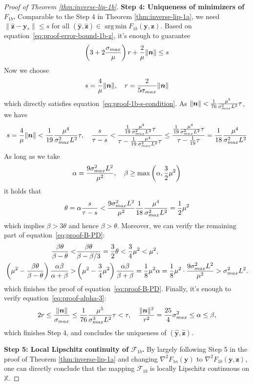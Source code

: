 \documentclass[10pt,a4paper]{amsart}
\DeclareMathOperator*{\argmin}{arg\,min}
\def\cF{{\mathcal{F}}}
\def\eqref#1{equation~\ref{#1}}
\def\sX{{\mathbb{X}}}
\def\vn{{\bm{n}}}
\def\vy{{\bm{y}}}
\def\vz{{\bm{z}}}
\begin{document}
\begin{proof}[Proof of Theorem \ref{thm:inverse-lip-1b}]
\textbf{Step 4: Uniqueness of minimizers of $F_{1b}$.} Comparable to the Step 4 in Theorem \ref{thm:inverse-lip-1a}, we need $\|\hat{\vz}-\vy_\ast\| \leq s$ for all $(\hat{\vy},\hat{\vz}) \in \argmin F_{1b}(\vy,\vz)$. Based on \eqref{eq:proof-error-bound-1b-z}, it's enough to guarantee
\begin{equation}
\label{eq:proof-1b-s-condition}
\left(3 + 2 \frac{\sigma_{\textup{max}}}{\mu} \right) r + \frac{2}{\mu} \|\vn\| \leq s
\end{equation}
Now we choose
\[ s = \frac{4}{\mu} \|\vn\|, \quad r = \frac{2}{5\sigma_{\textup{max}}} \|\vn\|\]
which directly satisfies \eqref{eq:proof-1b-s-condition}. As $\|\vn\| < \frac{1}{76}\frac{\mu^5}{\sigma^2_{\textup{max}}L^2} \tau$, we have
\[ s = \frac{4}{\mu} \|\vn\| < \frac{1}{19} \frac{\mu^4}{\sigma^2_{\textup{max}}L^2} \tau, \quad \frac{s}{\tau-s} < \frac{\frac{1}{19} \frac{\mu^4}{\sigma^2_{\textup{max}}L^2} \tau}{\tau - \frac{1}{19} \frac{\mu^4}{\sigma^2_{\textup{max}}L^2} \tau} \leq \frac{\frac{1}{19} \frac{\mu^4}{\sigma^2_{\textup{max}}L^2} \tau}{\tau - \frac{1}{19}  \tau} = \frac{1}{18} \frac{\mu^4}{\sigma^2_{\textup{max}}L^2}\]
As long as we take
\[\alpha = \frac{9\sigma^2_{\textup{max}}L^2}{\mu^2}, \quad \beta \geq \max\left(\alpha, \frac{3}{2} \mu^2\right)\]
it holds that
\[
\theta = \alpha \frac{s}{\tau-s} < \frac{9\sigma^2_{\textup{max}}L^2}{\mu^2} \frac{1}{18} \frac{\mu^4}{\sigma^2_{\textup{max}}L^2} = \frac{1}{2} \mu^2 
\]
which implies $\beta > 3 \theta$ and hence $\beta > \theta$. Moreover, we can verify the remaining part of \eqref{eq:proof-B-PD}:
\[
\begin{aligned}
\frac{\beta \theta}{\beta-\theta} <&  \frac{\beta \theta}{\beta - \beta/3} = \frac{3}{2}\theta < \frac{3}{4}\mu^2 < \mu^2, \\ 
\left(\mu^2 - \frac{\beta \theta}{\beta-\theta}\right)\frac{\alpha\beta}{\alpha+\beta} >&  \left(\mu^2 - \frac{3}{4}\mu^2\right) \frac{\alpha\beta}{\beta+\beta} = \frac{1}{8} \mu^2 \alpha = \frac{1}{8} \mu^2 \cdot \frac{9\sigma^2_{\textup{max}}L^2}{\mu^2} > \sigma^2_{\textup{max}}L^2.
\end{aligned}
\]
which finishes the proof of \eqref{eq:proof-B-PD}. Finally, it's enough to verify \eqref{eq:proof-alpha-3}:
  \[2r \leq \frac{\|\vn\|}{\sigma_{\textup{max}}} \leq \frac{1}{76}\frac{\mu^5}{\sigma^3_{\textup{max}}L^2} \tau < \tau, \quad \frac{\|\vn\|^2}{r^2} = \frac{25}{4} \sigma^2_{\textup{max}} \leq \alpha \leq \beta,\]
  which finishes Step 4, and concludes the uniqueness of $(\hat{\vy},\hat{\vz})$.
  

\textbf{Step 5: Local Lipschitz continuity of $\cF_{1b}$.} By largely following Step 5 in the proof of Theorem \ref{thm:inverse-lip-1a} and changing $\nabla^2 F_{1a}(\vy)$ to $\nabla^2 F_{1b}(\vy,\vz)$, one can directly conclude that the mapping $\cF_{1b}$ is locally Lipschitz continuous on $\sX$.
\end{proof}
\end{document}
